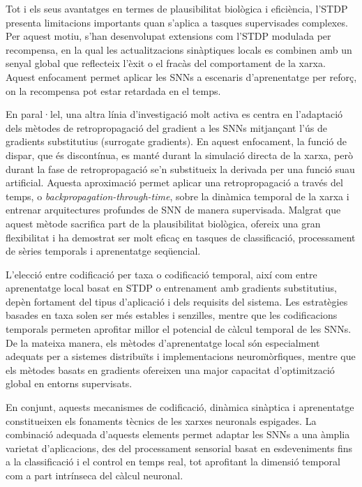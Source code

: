 \documentclass[a4paper,11pt, titlepage, twoside]{article}
\begin{document}
Tot i els seus avantatges en termes de plausibilitat biològica i eficiència, l'STDP presenta limitacions importants quan s'aplica a tasques supervisades complexes. Per aquest motiu, s'han desenvolupat extensions com l'STDP modulada per recompensa, en la qual les actualitzacions sinàptiques locals es combinen amb un senyal global que reflecteix l'èxit o el fracàs del comportament de la xarxa. Aquest enfocament permet aplicar les SNNs a escenaris d'aprenentatge per reforç, on la recompensa pot estar retardada en el temps.

En paral·lel, una altra línia d'investigació molt activa es centra en l'adaptació dels mètodes de retropropagació del gradient a les SNNs mitjançant l'ús de gradients substitutius (surrogate gradients). En aquest enfocament, la funció de dispar, que és discontínua, es manté durant la simulació directa de la xarxa, però durant la fase de retropropagació se'n substitueix la derivada per una funció suau artificial. Aquesta aproximació permet aplicar una retropropagació a través del temps, o \textit{backpropagation-through-time}, sobre la dinàmica temporal de la xarxa i entrenar arquitectures profundes de SNN de manera supervisada. Malgrat que aquest mètode sacrifica part de la plausibilitat biològica, ofereix una gran flexibilitat i ha demostrat ser molt eficaç en tasques de classificació, processament de sèries temporals i aprenentatge seqüencial.

L'elecció entre codificació per taxa o codificació temporal, així com entre aprenentatge local basat en STDP o entrenament amb gradients substitutius, depèn fortament del tipus d'aplicació i dels requisits del sistema. Les estratègies basades en taxa solen ser més estables i senzilles, mentre que les codificacions temporals permeten aprofitar millor el potencial de càlcul temporal de les SNNs. De la mateixa manera, els mètodes d'aprenentatge local són especialment adequats per a sistemes distribuïts i implementacions neuromòrfiques, mentre que els mètodes basats en gradients ofereixen una major capacitat d'optimització global en entorns supervisats.

En conjunt, aquests mecanismes de codificació, dinàmica sinàptica i aprenentatge constitueixen els fonaments tècnics de les xarxes neuronals espigades. La combinació adequada d'aquests elements permet adaptar les SNNs a una àmplia varietat d'aplicacions, des del processament sensorial basat en esdeveniments fins a la classificació i el control en temps real, tot aprofitant la dimensió temporal com a part intrínseca del càlcul neuronal.
\end{document}
